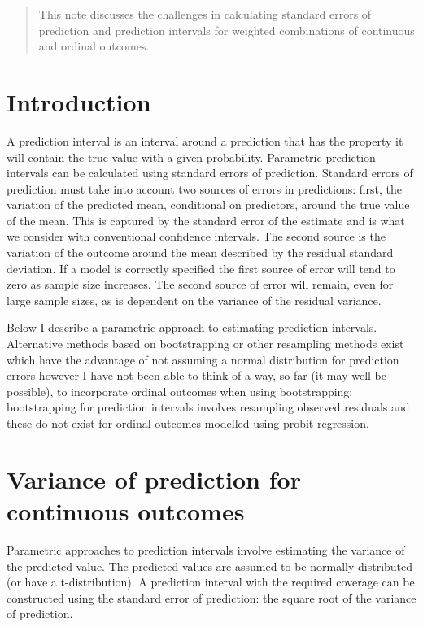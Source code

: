 \documentclass[12pt]{article}
\begin{document}
\maketitle


\begin{abstract}
    This note discusses the challenges in calculating standard errors of prediction and prediction intervals for  weighted combinations of continuous and ordinal outcomes.
\end{abstract}

\section{Introduction}
A prediction interval is an interval around a prediction that has the property it will contain the true value with a given probability. Parametric prediction intervals can be calculated using standard errors of prediction. Standard errors of prediction must take into account two sources of errors in predictions: first, the variation of the predicted mean, conditional on predictors, around the true value of the mean. This is captured by the standard error of the estimate and is what we consider with conventional confidence intervals. The second source is the variation of the outcome around the mean described by the residual standard deviation. If a model is correctly specified the first source of error will tend to zero as sample size increases. The second source of error will remain, even for large sample sizes, as is  dependent on the variance of the residual variance. 

Below I describe a parametric approach to estimating prediction intervals. Alternative methods based on bootstrapping or other resampling methods exist which have the advantage of not assuming a normal distribution for prediction errors however I have not been able to think of a way, so far (it may well be possible), to incorporate ordinal outcomes when using bootstrapping: bootstrapping for prediction intervals involves resampling observed residuals and these do not exist for ordinal outcomes modelled using probit regression.


\section{Variance of prediction for continuous outcomes}
Parametric approaches to prediction intervals involve estimating the variance of the predicted value. The  predicted values are assumed to be normally distributed (or have a t-distribution). A prediction interval with the required coverage can be constructed using the standard error of prediction: the square root of the variance of prediction.
\end{document}
